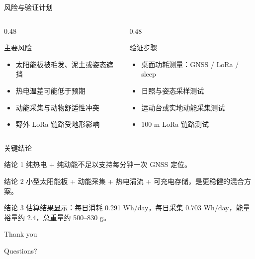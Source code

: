 \documentclass[aspectratio=169,11pt]{ctexbeamer}
\newcommand{\whday}{Wh/day}
\begin{document}
\begin{frame}{风险与验证计划}
  \begin{columns}[T,onlytextwidth]
    \begin{column}{0.48\textwidth}
      \begin{block}{主要风险}
        \begin{itemize}
          \item 太阳能板被毛发、泥土或姿态遮挡
          \item 热电温差可能低于预期
          \item 动能采集与动物舒适性冲突
          \item 野外 LoRa 链路受地形影响
        \end{itemize}
      \end{block}
    \end{column}
    \begin{column}{0.48\textwidth}
      \begin{block}{验证步骤}
        \begin{itemize}
          \item 桌面功耗测量：GNSS / LoRa / sleep
          \item 日照与姿态采样测试
          \item 运动台或实地动能采集测试
          \item 100 m LoRa 链路测试
        \end{itemize}
      \end{block}
    \end{column}
  \end{columns}
\end{frame}

\begin{frame}{关键结论}
  \begin{block}{结论 1}
    纯热电 + 纯动能不足以支持每分钟一次 GNSS 定位。
  \end{block}
  \begin{block}{结论 2}
    小型太阳能板 + 动能采集 + 热电涓流 + 可充电存储，是更稳健的混合方案。
  \end{block}
  \begin{block}{结论 3}
    估算结果显示：每日消耗 0.291 \whday，每日采集 0.703 \whday，能量裕量约 2.4，总重量约 500--830 g。
  \end{block}
\end{frame}

\begin{frame}
  \centering
  \Huge Thank you

  \vspace{1em}
  \Large Questions?
\end{frame}
\end{document}

